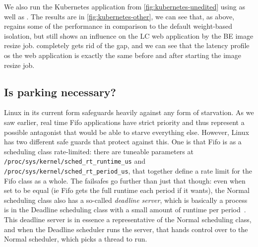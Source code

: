 We also run the Kubernetes application from \autoref{fig:kubernetes-unedited}
using \schedidle{} as well as \schedbe{}. The results are in
\autoref{fig:kubernetes-other}, we can see that, as above, \schedidle{} regains
some of the performance in comparison to the default weight-based isolation, but
still shows an influence on the LC web application by the BE image resize job.
\schedbe{} completely gets rid of the gap, and we can see that the latency
profile os the web application is exactly the same before and after starting the
image resize job.


\subsection{Is parking necessary?}

Linux in its current form safeguards heavily against any form of starvation. As
we saw earlier, real time Fifo applications have strict priority and thus
represent a possible antagonist that would be able to starve everything else.
However, Linux has two different safe guards that protect against this. One is
that Fifo is as a scheduling class rate-limited: there are tuneable parameters
at \texttt{/proc/sys/kernel/sched\_rt\_runtime\_us} and
\texttt{/proc/sys/kernel/sched\_rt\_period\_us}, that together define a rate
limit for the Fifo class as a whole. The failsafes go further than just that
though: even when set to be equal (ie Fifo gets the full runtime each period if
it wants), the Normal scheduling class also has a so-called \textit{deadline
server}, which is basically a process is in the Deadline scheduling class with a
small amount of runtime per period~\cite{lkml-deadline-srv}. This deadline
server is in essence a representative of the Normal scheduling class, and when
the Deadline scheduler runs the server, that hands control over to the Normal
scheduler, which picks a thread to run.


